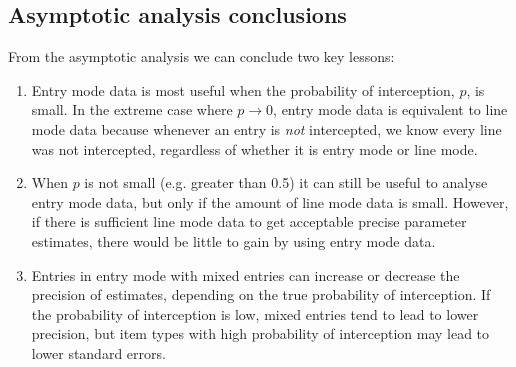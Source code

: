 \documentclass{article}
\begin{document}
%
%
%
%


\subsection{Asymptotic analysis conclusions}

From the asymptotic analysis we can conclude two key lessons:
\begin{enumerate}
\item Entry mode data is most useful when the probability of interception, \(p\), is small. In the extreme case where \(p\rightarrow 0\), entry mode data is equivalent to line mode data because whenever an entry is \emph{not} intercepted, we know every line was not intercepted, regardless of whether it is entry mode or line mode. 
\item When \(p\) is not small (e.g. greater than 0.5) it can still be useful to analyse entry mode data, but only if the amount of line mode data is small. However, if there is sufficient line mode data to get acceptable precise parameter estimates, there would be little to gain by using entry mode data.
\item Entries in entry mode with mixed entries can increase or decrease the precision of estimates, depending on the true probability of interception. If the probability of interception is low, mixed entries tend to lead to lower precision, but item types with high probability of interception may lead to lower standard errors.
\end{enumerate}
\end{document}
